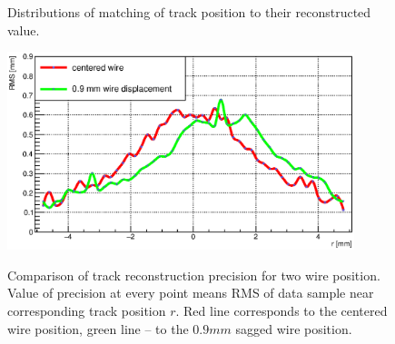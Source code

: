 \documentclass[]{article}
\begin{document}
	\begin{figure}[h!]
		\centering
		\qquad
		\caption{Distributions of matching of track position to their reconstructed value.}
	\end{figure}
	
	\begin{figure}[h!]
	\centering
	\includegraphics[width=0.9\textwidth]{precisionCompare_0_9}
	\label{fig:precisionCompare09}
	\caption{Comparison of track reconstruction precision for two wire position. Value of precision at every point means RMS of data sample near corresponding track position $r$. Red line corresponds to the centered wire position, green line -- to the $0.9 mm$ sagged wire  position.}
	\end{figure}
	
\end{document}
